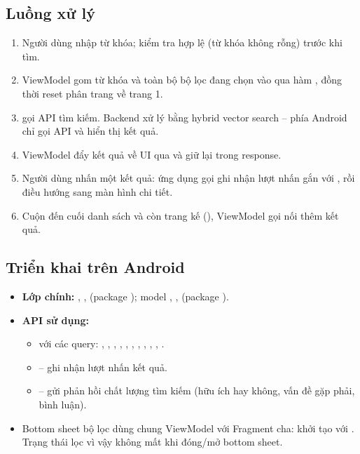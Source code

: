 \subsection{Luồng xử lý}
\begin{enumerate}
    \item Người dùng nhập từ khóa;  kiểm tra hợp lệ (từ
    khóa không rỗng) trước khi tìm.
    \item ViewModel gom từ khóa và toàn bộ bộ lọc đang chọn vào
     qua hàm , đồng thời reset
    phân trang về trang 1.
    \item {} gọi API tìm kiếm. Backend xử lý bằng
    hybrid vector search -- phía Android chỉ gọi API và hiển thị kết quả.
    \item ViewModel đẩy kết quả về UI qua
     và giữ lại  trong
    response.
    \item Người dùng nhấn một kết quả: ứng dụng gọi
     ghi nhận lượt nhấn gắn với
    , rồi điều hướng sang màn hình chi tiết.
    \item Cuộn đến cuối danh sách và còn trang kế (),
    ViewModel gọi  nối thêm kết quả.
\end{enumerate}

\subsection{Triển khai trên Android}
\begin{itemize}
    \item \textbf{Lớp chính:} , ,
     (package ); model
    , ,
     (package ).
    \item \textbf{API sử dụng:}
    \begin{itemize}
        \item {} với các query:
        , , , ,
        , , , ,
        , , .
        \item {} -- ghi nhận lượt nhấn kết quả.
        \item {} -- gửi phản hồi chất lượng
        tìm kiếm (hữu ích hay không, vấn đề gặp phải, bình luận).
    \end{itemize}
    \item Bottom sheet bộ lọc dùng chung ViewModel với Fragment cha: khởi tạo
     với . Trạng thái lọc
    vì vậy không mất khi đóng/mở bottom sheet.
\end{itemize}

